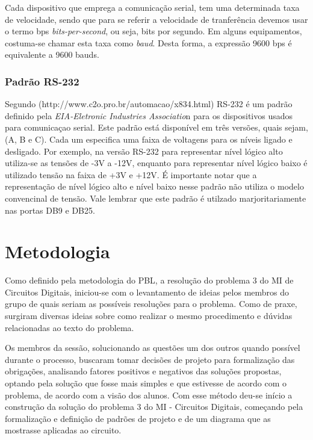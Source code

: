 \documentclass[12pt]{article}
\begin{document}



Cada dispositivo que emprega a comunicação serial, tem uma determinada taxa de velocidade, sendo que para se referir a velocidade de tranferência devemos usar o termo bps \textit{bits-per-second}, ou seja, bits por segundo. Em alguns equipamentos, costuma-se chamar esta taxa  como \textit{baud}. Desta forma, a expressão 9600 bps é equivalente a 9600 bauds.
\subsubsection{Padrão RS-232}
Segundo (http://www.c2o.pro.br/automacao/x834.html) RS-232 é um padrão definido pela \textit{EIA-Eletronic Industries Associatio}n para os dispositivos usados para comunicaçao serial. Este padrão está disponível em três versões, quais sejam, (A, B e C). Cada um especifica uma faixa de voltagens para os níveis ligado e desligado. Por exemplo, na versão RS-232 para representar  nível lógico alto utiliza-se as tensões de -3V a -12V, enquanto para representar nível lógico baixo é utilizado tensão na faixa de +3V e +12V. É importante notar que a representação de nível lógico alto e nível baixo nesse padrão não utiliza o modelo convencinal de tensão. Vale lembrar que este padrão é utilzado marjoritariamente nas portas DB9 e DB25.  


\section{Metodologia}
Como definido pela metodologia do PBL, a resolução do problema 3 do MI de Circuitos Digitais, iniciou-se com o levantamento de ideias pelos membros do grupo de quais seriam as possíveis resoluções para o problema. Como de praxe, surgiram diversas ideias sobre como realizar o mesmo procedimento e dúvidas relacionadas ao texto do problema. 

Os membros da sessão, solucionando as questões um dos outros quando possível durante o processo, buscaram tomar decisões de projeto para formalização das obrigações, analisando fatores positivos e negativos das soluções propostas, optando pela solução que fosse mais simples e que estivesse de acordo com o problema, de acordo com a visão dos alunos. Com esse método deu-se início a construção da solução do problema 3 do MI - Circuitos Digitais, começando pela formalização e definição de padrões de projeto e de um diagrama que as mostrasse aplicadas ao circuito.
\end{document}
